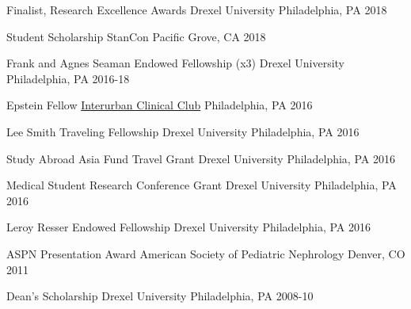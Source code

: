 



\begin{cvhonors}

  \cvhonor
    {Finalist, Research Excellence Awards} %
    {Drexel University} %
    {Philadelphia, PA} %
    {2018} %

  \cvhonor
    {Student Scholarship} %
    {StanCon} %
    {Pacific Grove, CA} %
    {2018} %

  \cvhonor
    {Frank and Agnes Seaman Endowed Fellowship (x3)} %
    {Drexel University} %
    {Philadelphia, PA} %
    {2016-18} %


  \cvhonor
    {Epstein Fellow} %
    {\href{http://interurbanclinicalclub.org/}{Interurban Clinical Club}} %
    {Philadelphia, PA} %
    {2016} %
    

  \cvhonor
    {Lee Smith Traveling Fellowship} %
    {Drexel University} %
    {Philadelphia, PA} %
    {2016} %
    

  \cvhonor
    {Study Abroad Asia Fund Travel Grant} %
    {Drexel University} %
    {Philadelphia, PA} %
    {2016} %
    
  \cvhonor
    {Medical Student Research Conference Grant} %
    {Drexel University} %
    {Philadelphia, PA} %
    {2016} %
    
  \cvhonor
    {Leroy Resser Endowed Fellowship} %
    {Drexel University} %
    {Philadelphia, PA} %
    {2016} %
    
  \cvhonor
    {ASPN Presentation Award} %
    {American Society of Pediatric Nephrology} %
    {Denver, CO} %
    {2011} %

  \cvhonor
    {Dean's Scholarship} %
    {Drexel University} %
    {Philadelphia, PA} %
    {2008-10} %
\end{cvhonors}

